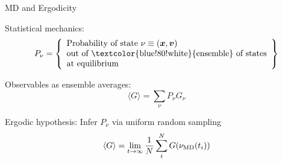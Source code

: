 \begin{frame}[fragile]{MD and Ergodicity}

\textcolor{green!80!black}{Statistical mechanics:}
$$
P_\nu = \left\{\begin{array}{l}
    \mbox{Probability of state $\nu \equiv (\xb,\vb)$}\\
    \mbox{out of \textcolor{blue!80!white}{ensemble} of states}\\
    \mbox{at equilibrium}\\
        \end{array}\right\}
$$

Observables as \textcolor{blue!80!white}{ensemble averages}:
$$
\langle G \rangle = \sum_\nu P_\nu G_\nu
$$

\textcolor{green!80!black}{Ergodic hypothesis: Infer $P_\nu$ via uniform random sampling}
$$
\langle G \rangle = \lim_{t\rightarrow\infty} \frac{1}{N}\sum_{i}^{N}G(\nu_{\rm MD}(t_i))
$$ 

\begin{center}
\fbox{\textcolor{red!80!black}{Ergodicity in MD is (usually) unattainable!}}
\end{center}

\end{frame}

